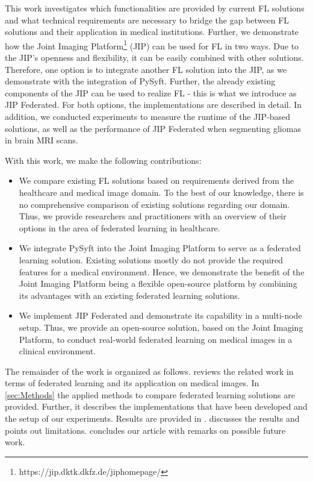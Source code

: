 This work investigates which functionalities are provided by current FL solutions and what technical requirements are necessary to bridge the gap between FL solutions and their application in medical institutions. 
Further, we demonstrate how the Joint Imaging Platform\footnote{https://jip.dktk.dkfz.de/jiphomepage/} (JIP\citep{Scherer2020JointAnalytics}) can be used for FL in two ways.
Due to the JIP's openness and flexibility, it can be easily combined with other solutions. Therefore, one option is to integrate another FL solution into the JIP, as we demonstrate with the integration of PySyft. Further, the already existing components of the JIP can be used to realize FL - this is what we introduce as JIP Federated. For both options, the implementations are described in detail. 
In addition, we conducted experiments to measure the runtime of the JIP-based solutions, as well as the performance of JIP Federated when segmenting gliomas in brain MRI scans.

With this work, we make the following contributions:
\begin{itemize}
    \item We compare existing FL solutions based on requirements derived from the healthcare and medical image domain. To the best of our knowledge, there is no comprehensive comparison of existing solutions regarding our domain. Thus, we provide researchers and practitioners with an overview of their options in the area of federated learning in healthcare.
    \item We integrate PySyft into the Joint Imaging Platform to serve as a federated learning solution. Existing solutions mostly do not provide the required features for a medical environment. Hence, we demonstrate the benefit of the Joint Imaging Platform being a flexible open-source platform by combining its advantages with an existing federated learning solutions.
    \item We implement JIP Federated and demonstrate its capability in a multi-node setup. Thus, we provide an open-source solution, based on the Joint Imaging Platform, to conduct real-world federated learning on medical images in a clinical environment.
\end{itemize}

The remainder of the work is organized as follows.  reviews the related work in terms of federated learning and its application on medical images. In \cref{sec:Methods} the applied methods to compare federated learning solutions are provided. Further, it describes the implementations that have been developed and the setup of our experiments. Results are provided in .  discusses the results and points out limitations.  concludes our article with remarks on possible future work.









